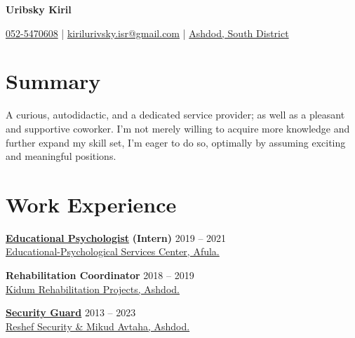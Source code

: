 \documentclass[
	12pt,a4paper %
]{article}
\begin{document}
\begin{center}
				{\Huge{\textbf{Uribsky Kiril}}}

\vspace{2pt}
\colorbox{shade}{ %
\raisebox{-1pt}{\faPhone} \href{tel:972525470608}{052-5470608} | \raisebox{0pt}{\small\faEnvelope} \href{mailto:kirilurivsky.isr@gmail.com}{kirilurivsky.isr@gmail.com} | \raisebox{0pt}{\faHome} \href{https://goo.gl/maps/MSacjpSy7vZSKykP7}{Ashdod, South District}
}
\end{center}

\section{Summary}
A curious, autodidactic, and a dedicated service provider; as well as a pleasant and supportive coworker. I'm not merely willing to acquire more knowledge and further expand my skill set, I'm eager to do so, optimally by assuming exciting and meaningful positions.

\section{Work Experience}

\textbf{\large \href{https://loona-il.000webhostapp.com/resume-references/conf.png}{Educational Psychologist}} \textbf{(Intern)} \hfill 2019 -- 2021 \\
{\href{https://loona-il.000webhostapp.com/resume-references/conf.png}{Educational-Psychological Services Center, Afula.}} 

\noindent\dotfill %

\noindent\textbf{\large Rehabilitation Coordinator} \hfill 2018 -- 2019 \\
\href{http://www.kidumpro.co.il/}{Kidum Rehabilitation Projects, Ashdod.}

\noindent\dotfill %

\noindent\href{https://loona-il.000webhostapp.com/resume-references/recommendation-letter-security-guard.jpg}{\large \textbf{Security Guard}} \hfill 2013 -- 2023 \\
\href{https://loona-il.000webhostapp.com/resume-references/recommendation-letter-security-guard.jpg}{Reshef Security \& Mikud Avtaha, Ashdod.}
\end{document}
